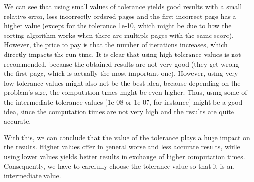 \documentclass[11pt,a4paper]{article}
\begin{document}
We can see that using small values of tolerance yields good results with a small relative error,
less incorrectly ordered pages and the first incorrect page has a higher value (except for the tolerance
1e-10, which might be due to how the sorting algorithm works when there are multiple pages with
the same score). However, the price to pay is that the number of iterations increases, which directly
impacts the run time. It is clear that using high tolerance values is not recommended, because
the obtained results are not very good (they get wrong the first page, which is actually the
most important one). However, using very low tolerance values might also not be the best idea, because
depending on the problem's size, the computation times might be even higher. Thus, using some
of the intermediate tolerance values (1e-08 or 1e-07, for instance) might be a good idea, since
the computation times are not very high and the results are quite accurate.

With this, we can conclude that the value of the tolerance plays a huge impact on the results. Higher
values offer in general worse and less accurate results, while using lower values yields better results
in exchange of higher computation times. Consequently, we have to carefully choose the tolerance value
so that it is an intermediate value.

\begin{table}[H]
\centering
{}
\caption{Results of the first implementation of the power method.}
\label{tab:power-method}
\end{table}
\end{document}

